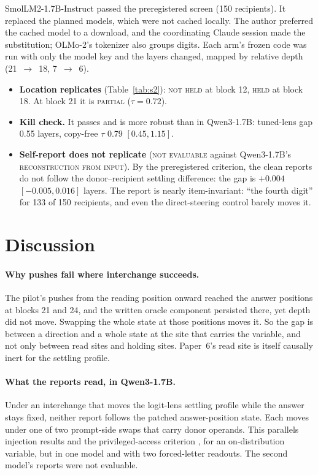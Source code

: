 \documentclass[11pt]{article}
\newcommand{\verdict}[1]{\textsc{\MakeLowercase{#1}}}
\begin{document}
SmolLM2-1.7B-Instruct passed the preregistered screen (150 recipients). It replaced the planned models, which were not cached locally. The author preferred the cached model to a download, and the coordinating Claude session made the substitution; OLMo-2's tokenizer also groups digits. Each arm's frozen code was run with only the model key and the layers changed, mapped by relative depth (21~$\to$~18, 7~$\to$~6).
\begin{itemize}
\item \textbf{Location replicates} (Table~\ref{tab:s2}): \verdict{NOT HELD} at block 12, \verdict{HELD} at block 18. At block 21 it is \verdict{PARTIAL} ($\tau = 0.72$).
\item \textbf{Kill check.} It passes and is more robust than in Qwen3-1.7B: tuned-lens gap 0.55 layers, copy-free $\tau$ 0.79 $[0.45, 1.15]$.
\item \textbf{Self-report does not replicate} (\verdict{NOT EVALUABLE} against Qwen3-1.7B's \verdict{RECONSTRUCTION FROM INPUT}). By the preregistered criterion, the clean reports do not follow the donor--recipient settling difference: the gap is $+0.004$ $[-0.005, 0.016]$ layers. The report is nearly item-invariant: ``the fourth digit'' for 133 of 150 recipients, and even the direct-steering control barely moves it.
\end{itemize}

\section{Discussion}

\paragraph{Why pushes fail where interchange succeeds.} The pilot's pushes from the reading position onward reached the answer positions at blocks 21 and 24, and the written oracle component persisted there, yet depth did not move. Swapping the whole state at those positions moves it. So the gap is between a direction and a whole state at the site that carries the variable, and not only between read sites and holding sites. Paper~6's read site is itself causally inert for the settling profile.

\paragraph{What the reports read, in Qwen3-1.7B.} Under an interchange that moves the logit-lens settling profile while the answer stays fixed, neither report follows the patched answer-position state. Each moves under one of two prompt-side swaps that carry donor operands. This parallels injection results \citep{ferrara2026owmi,hatua2026verbalization} and the privileged-access criterion \citep{song2025privileged,aoki2026neurofeedback}, for an on-distribution variable, but in one model and with two forced-letter readouts. The second model's reports were not evaluable.
\end{document}
